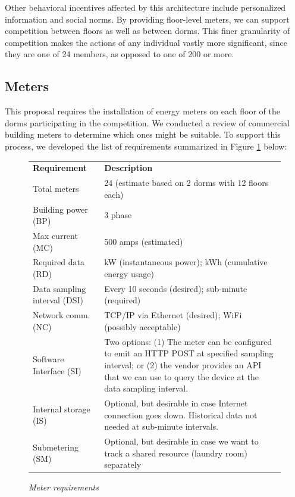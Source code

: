 \documentclass[11pt]{article}
\begin{document}
Other behavioral incentives affected by this architecture include
personalized information and social norms.  By providing floor-level
meters, we can support competition between floors as well as between dorms.
This finer granularity of competition makes the actions of any individual
vastly more significant, since they are one of 24 members, as opposed to
one of 200 or more.

\subsection{Meters}
\label{sec:meters}

This proposal requires the installation of energy meters on each floor of
the dorms participating in the competition.  We conducted a review of
commercial building meters to determine which ones might be
suitable.  To support this process, we developed the list of
requirements summarized in Figure \ref{fig:meterrequirements} below:

\begin{figure}[!ht]
\small
\begin{tabular}{p{1.75in}p{4.25in}} \hline
{\bf Requirement} & {\bf Description}  \\
Total meters & 24 (estimate based on 2 dorms with 12 floors each) \\ 

Building power (BP) & 3 phase \\  

Max current (MC) & 500 amps (estimated)  \\ 

Required data (RD) & kW (instantaneous power); kWh (cumulative energy usage) \\ 

Data sampling interval (DSI) & Every 10 seconds (desired); sub-minute (required) \\ 

Network comm. (NC) & TCP/IP via Ethernet (desired); WiFi (possibly acceptable) \\ 

Software Interface (SI) & Two options: (1) The meter can be configured to emit
an HTTP POST at specified sampling interval; or (2) the vendor provides an
API that we can use to query the device at the data sampling interval. \\ 

Internal storage (IS) & Optional, but desirable in case Internet connection
goes down. Historical data not needed at sub-minute intervals. \\ 

Submetering (SM) & Optional, but desirable in case we want to track a shared
resource (laundry room) separately \\ \hline

\end{tabular} 
\normalsize
\caption{{\em Meter requirements}}
\label{fig:meterrequirements}
\end{figure}
\end{document}
